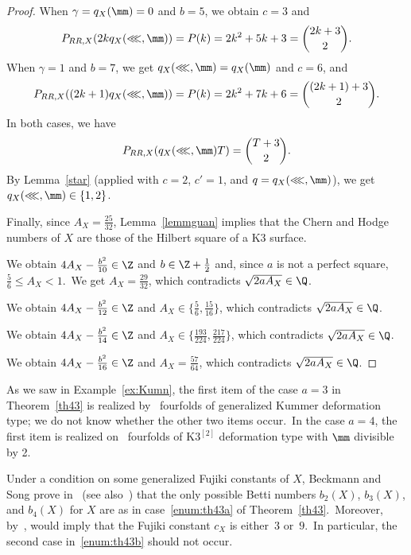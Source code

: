 \begin{proof}
When $\gamma=q_X( \mm)=0$ and $b=5$, we
obtain $c=3$ and
\[
P_{RR,X}(2kq_X(\lll,\mm))=P(k)= 2k^2 + 5  k +3=\binom{2k+3}{2}.
\]
When
$\gamma=1$ and $b=7$, we   get $q_X(\lll,\mm)=q_X(\mm)$ and $c=6$, and
\[
P_{RR,X}((2k+1)q_X(\lll,\mm))=P(k)= 2k^2 +7  k +6=\binom{(2k+1)+3}{2}.
\]
 In both cases, we have
 $$
 P_{RR,X}(q_X(\lll,\mm)T)=\binom{T+3}{2}.
 $$
 By Lemma~\ref{star} (applied with $c=2$, $c'=1$, and $q=q_X(\lll,\mm)$),
we get $q_X(\lll,\mm)\in\{1,2\}$.

Finally, since $A_X=\frac{25}{32}$, Lemma~\ref{lemmguan} implies that  the Chern and Hodge numbers of $X$ are those of the Hilbert square of a K3 surface.


 We   obtain $4A_X-\frac{b^2}{10}\in\Z$ and $b\in  \Z +\frac12$ and, since $a$ is not a perfect square, $\frac{5}{6}\le A_X<1 $.\
We get $A_X=\frac{29}{32} $, which contradicts  $\sqrt{2aA_X}\in\Q$.


 We   obtain $4A_X-\frac{b^2}{12}\in\Z$ and $A_X\in\{\frac56,\frac{15}{16}\}$, which contradicts  $\sqrt{2aA_X}\in\Q$.


 We   obtain $4A_X-\frac{b^2}{14}\in\Z$ and $A_X\in\{\frac{193}{224},\frac{217}{224}\}$, which contradicts  $\sqrt{2aA_X}\in\Q$.


 We   obtain $4A_X-\frac{b^2}{16}\in\Z$ and $A_X=\frac{57}{64}$, which contradicts  $\sqrt{2aA_X}\in\Q$.
\end{proof}

As we saw in Example~\ref{ex:Kumn},  the first item of the case $a=3$ in Theorem~\ref{th43} is realized by \hk\ fourfolds  of generalized Kummer deformation type;  we do not know whether the other two items occur.\
In the case $a=4$, the first item is realized  on \hk\ fourfolds of $\mathrm{K3}^{[2]}$ deformation type with $\mm$ divisible by 2.

Under a condition on some generalized Fujiki constants of $X$, Beckmann and Song prove in~\cite{bs} (see also~\cite{saw2}) that the only possible Betti numbers $b_2(X)$, $b_3(X)$, and $b_4(X)$ for $X$ are as in case~\ref{enum:th43a} of Theorem~\ref{th43}.\
Moreover, by~\cite[Proposition 5.6]{bs}, \cite[Conjecture 1.2]{bs} would imply that the Fujiki constant $c_X$ is either~$3$ or~$9$.\ In particular, the second case in~\ref{enum:th43b} should not occur.



